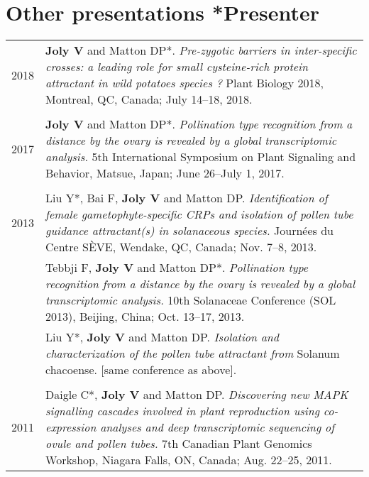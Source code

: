 \documentclass[letterpaper,12pt]{article}
\begin{document}
\vspace{6mm}

\section[Other presentations]{Other presentations \hfill \small{*Presenter}}

\begin{tabularx}{\textwidth}{@{}r|X@{}}

2018
& \textbf{Joly V} and Matton DP*.
  \emph{Pre-zygotic barriers in inter-specific crosses: a leading role for small
  cysteine-rich protein attractant in wild potatoes species ?}
  Plant Biology 2018, Montreal, QC, Canada;
  July 14–18, 2018.
  \\

\multicolumn{2}{c}{} \\

2017
& \textbf{Joly V} and Matton DP*.
  \emph{Pollination type recognition from a distance by the ovary is revealed
  by a global transcriptomic analysis.}
  5th International Symposium on Plant Signaling and Behavior, Matsue, Japan;
  June 26–July 1, 2017.
  \\

\multicolumn{2}{c}{} \\

2013
& Liu Y*, Bai F, \textbf{Joly V} and Matton DP.
  \emph{Identification of female gametophyte-specific CRPs and isolation of
  pollen tube guidance attractant(s) in solanaceous species.}
  Journées du Centre SÈVE, Wendake, QC, Canada;
  Nov. 7–8, 2013.
  \vspace{1.5mm}
  \\

& Tebbji F, \textbf{Joly V} and Matton DP*. \emph{Pollination type recognition
  from a distance by the ovary is revealed by a global transcriptomic analysis.}
  10th Solanaceae Conference (SOL 2013), Beijing, China;
  Oct. 13–17, 2013.
  \vspace{1.5mm}
  \\

& Liu Y*, \textbf{Joly V} and Matton DP.
  \emph{Isolation and characterization of the pollen tube attractant from}
  Solanum chacoense. [same conference as above].
  \\

\multicolumn{2}{c}{} \\

2011
& Daigle C*, \textbf{Joly V} and Matton DP.
  \emph{Discovering new MAPK signalling cascades involved in plant reproduction
  using co-expression analyses and deep transcriptomic sequencing of ovule
  and pollen tubes.}
  7th Canadian Plant Genomics Workshop, Niagara Falls, ON, Canada;
  Aug. 22–25, 2011.
  \\

\end{tabularx}
\end{document}
